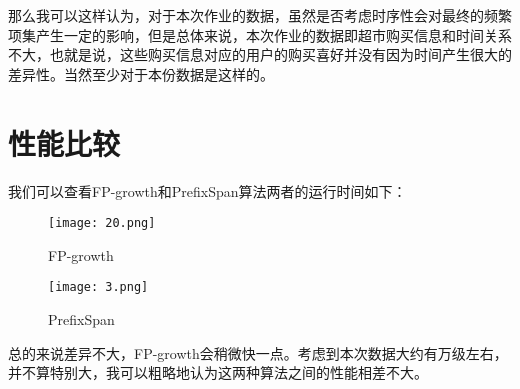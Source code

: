 \documentclass{article}
\begin{document}
\begin{CJK}{UTF8}{gbsn}
那么我可以这样认为，对于本次作业的数据，虽然是否考虑时序性会对最终的频繁项集产生一定的影响，但是总体来说，本次作业的数据即超市购买信息和时间关系不大，也就是说，这些购买信息对应的用户的购买喜好并没有因为时间产生很大的差异性。当然至少对于本份数据是这样的。

\section{性能比较}

我们可以查看FP-growth和PrefixSpan算法两者的运行时间如下：

\begin{figure}[!h]
\begin{center}
  \texttt{[image: 20.png]}	
  \caption{FP-growth}
\end{center}
\end{figure}

\begin{figure}[!h]
\begin{center}
  \texttt{[image: 3.png]}	
  \caption{PrefixSpan}
\end{center}
\end{figure}

总的来说差异不大，FP-growth会稍微快一点。考虑到本次数据大约有万级左右，并不算特别大，我可以粗略地认为这两种算法之间的性能相差不大。

\end{CJK}
\end{document}
